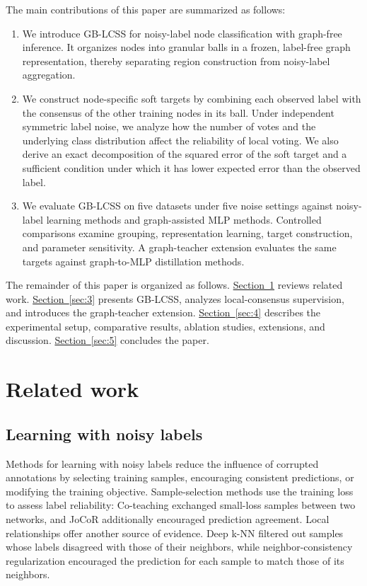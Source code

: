\documentclass[a4paper,fleqn]{cas-sc}
\theoremstyle{definition}
\theoremstyle{plain}
\begin{document}
The main contributions of this paper are summarized as follows:

\begin{enumerate}[label=(\arabic*)]
\item We introduce GB-LCSS for noisy-label node classification with graph-free inference. It organizes nodes into granular balls in a frozen, label-free graph representation, thereby separating region construction from noisy-label aggregation.
\item We construct node-specific soft targets by combining each observed label with the consensus of the other training nodes in its ball. Under independent symmetric label noise, we analyze how the number of votes and the underlying class distribution affect the reliability of local voting. We also derive an exact decomposition of the squared error of the soft target and a sufficient condition under which it has lower expected error than the observed label.
\item We evaluate GB-LCSS on five datasets under five noise settings against noisy-label learning methods and graph-assisted MLP methods. Controlled comparisons examine grouping, representation learning, target construction, and parameter sensitivity. A graph-teacher extension evaluates the same targets against graph-to-MLP distillation methods.
\end{enumerate}

The remainder of this paper is organized as follows. \hyperref[sec:2]{Section~\ref*{sec:2}} reviews related work. \hyperref[sec:3]{Section~\ref*{sec:3}} presents GB-LCSS, analyzes local-consensus supervision, and introduces the graph-teacher extension. \hyperref[sec:4]{Section~\ref*{sec:4}} describes the experimental setup, comparative results, ablation studies, extensions, and discussion. \hyperref[sec:5]{Section~\ref*{sec:5}} concludes the paper.

\section{Related work}\label{sec:2}

\subsection{Learning with noisy labels}\label{sec:2.1}

Methods for learning with noisy labels reduce the influence of corrupted annotations by selecting training samples, encouraging consistent predictions, or modifying the training objective. Sample-selection methods use the training loss to assess label reliability: Co-teaching \cite{ref17} exchanged small-loss samples between two networks, and JoCoR \cite{ref18} additionally encouraged prediction agreement. Local relationships offer another source of evidence. Deep k-NN \cite{ref11} filtered out samples whose labels disagreed with those of their neighbors, while neighbor-consistency regularization \cite{ref10} encouraged the prediction for each sample to match those of its neighbors.
\end{document}
